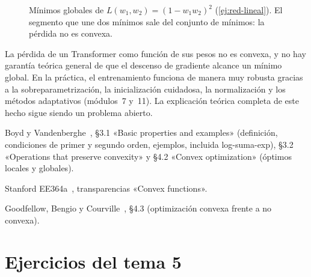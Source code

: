 \begin{figure}[h]
\centering
{}
\caption{Mínimos globales de $L(w_1,w_2)=(1-w_1w_2)^{2}$ (\cref{ej:red-lineal}). El segmento que une dos mínimos sale del conjunto de mínimos: la pérdida no es convexa.}
\label{fig:hiperbola}
\end{figure}

\begin{observacion}
La pérdida de un Transformer como función de sus pesos no es convexa, y no hay garantía teórica general de que el descenso de gradiente alcance un mínimo global. En la práctica, el entrenamiento funciona de manera muy robusta gracias a la sobreparametrización, la inicialización cuidadosa, la normalización y los métodos adaptativos (módulos~7 y~11). La explicación teórica completa de este hecho sigue siendo un problema abierto.
\end{observacion}

\begin{lecturas}
\item Boyd y Vandenberghe~\cite{bv}, §3.1 «Basic properties and examples» (definición, condiciones de primer y segundo orden, ejemplos, incluida log-suma-exp), §3.2 «Operations that preserve convexity» y §4.2 «Convex optimization» (óptimos locales y globales).
\item Stanford EE364a~\cite{ee364a}, transparencias «Convex functions».
\item Goodfellow, Bengio y Courville~\cite{gbc}, §4.3 (optimización convexa frente a no convexa).
\end{lecturas}

\section*{Ejercicios del tema 5}

